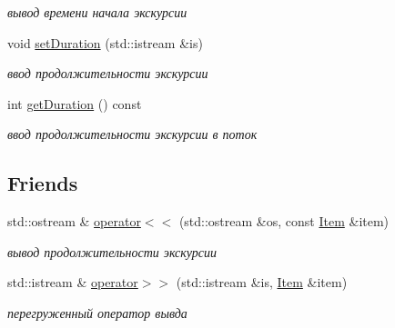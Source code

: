 \begin{DoxyCompactItemize}
\begin{DoxyCompactList}\small\item\em вывод времени начала экскурсии \end{DoxyCompactList}\item 
\hypertarget{class_item_aebe178d9136a81916fd7f56be7245293}{}void \hyperlink{class_item_aebe178d9136a81916fd7f56be7245293}{set\+Duration} (std\+::istream \&is)\label{class_item_aebe178d9136a81916fd7f56be7245293}

\begin{DoxyCompactList}\small\item\em ввод продолжительности экскурсии \end{DoxyCompactList}\item 
\hypertarget{class_item_aaed2c5908376d037db6df319bc2ec2c5}{}int \hyperlink{class_item_aaed2c5908376d037db6df319bc2ec2c5}{get\+Duration} () const \label{class_item_aaed2c5908376d037db6df319bc2ec2c5}

\begin{DoxyCompactList}\small\item\em ввод продолжительности экскурсии в поток \end{DoxyCompactList}\end{DoxyCompactItemize}
\subsection*{Friends}
\begin{DoxyCompactItemize}
\item 
\hypertarget{class_item_a2f8f92eea1c84a32bafc197830873f63}{}std\+::ostream \& \hyperlink{class_item_a2f8f92eea1c84a32bafc197830873f63}{operator$<$$<$} (std\+::ostream \&os, const \hyperlink{class_item}{Item} \&item)\label{class_item_a2f8f92eea1c84a32bafc197830873f63}

\begin{DoxyCompactList}\small\item\em вывод продолжительности экскурсии \end{DoxyCompactList}\item 
\hypertarget{class_item_abe2a847b86fc0c1f591d69fc7612bb5f}{}std\+::istream \& \hyperlink{class_item_abe2a847b86fc0c1f591d69fc7612bb5f}{operator$>$$>$} (std\+::istream \&is, \hyperlink{class_item}{Item} \&item)\label{class_item_abe2a847b86fc0c1f591d69fc7612bb5f}

\begin{DoxyCompactList}\small\item\em перегруженный оператор вывда \end{DoxyCompactList}\end{DoxyCompactItemize}


